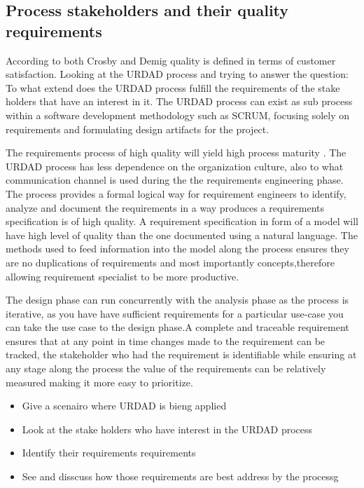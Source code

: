 
\subsection{Process stakeholders and their quality requirements}

According to both Crosby and Demig quality is defined in terms of customer satisfaction. Looking at the URDAD process and trying to answer the 
question: To what extend does the URDAD process fulfill the requirements of the stake holders that have an interest in it. The URDAD process can
exist as sub process within a software development methodology such as SCRUM, focusing solely on requirements and formulating design 
artifacts for the project.


The requirements process of high quality will yield high process maturity \cite  {Boehm_20Viev_Century_SE}. The URDAD process has
less dependence on the organization culture, also to what communication channel is used during the the requirements 
engineering phase. The process provides a formal logical way for requirement engineers to identify, analyze and document 
the requirements in a way produces a requirements specification is of high quality. A requirement specification in form of a model will 
have high level of quality than the one documented using a natural language. The methods used to feed information into the model along the process 
ensures they are no duplications of requirements and most importantly concepts,therefore allowing requirement specialist to be more productive. 


The design phase can run concurrently with the analysis phase as the process is iterative, as you have have sufficient requirements for a 
particular use-case you can take the use case to the design phase.A complete and traceable requirement ensures that at any point in time
changes made to the requirement can be tracked, the stakeholder who had the requirement is identifiable while ensuring at any stage along 
the process the value of the requirements can be relatively measured making it more easy to prioritize.


\begin {itemize}
 \item Give a scenairo where URDAD is bieng applied
 \item Look at the stake holders who have interest in the URDAD process 
 \item Identify their requirements requirements
 \item See and disscuss how those requirements are best address by the processg
\end {itemize}

